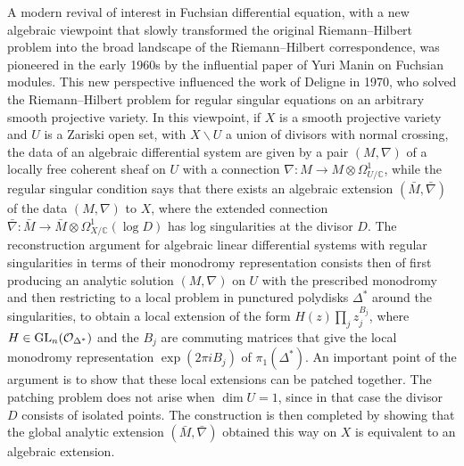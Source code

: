 \documentclass[10pt]{amsart}
\def\C{{\mathbb C}}
\renewcommand{\O}{{\mathcal O}}
\def\GL{{\rm GL}}
\numberwithin{equation}{section}
\begin{document}
A modern revival of interest in Fuchsian differential equation,
with a new algebraic viewpoint that slowly transformed the
original Riemann--Hilbert problem into the broad landscape of the
Riemann--Hilbert correspondence, was pioneered in the early 1960s
by the influential paper of Yuri Manin \cite{Man} on Fuchsian
modules. This new perspective influenced the work of Deligne
\cite{De1} in 1970, who solved the Riemann--Hilbert problem for
regular singular equations on an arbitrary smooth projective
variety. In this viewpoint, if $X$ is a smooth projective variety
and $U$ is a Zariski open set, with $X\smallsetminus U$ a union of
divisors with normal crossing, the data of an algebraic
differential system are given by a pair $(M,\nabla)$ of a locally
free coherent sheaf on $U$ with a connection $\nabla : M \to
M\otimes \Omega^1_{U/\C}$, while the regular singular condition
says that there exists an algebraic extension $(\bar M,
\bar\nabla)$ of the data $(M,\nabla)$ to $X$, where the extended
connection $\bar\nabla : \bar M \to \bar M \otimes
\Omega^1_{X/\C}(\log D)$ has log singularities at the divisor $D$.
The reconstruction argument for algebraic linear differential
systems with regular singularities in terms of their monodromy
representation consists then of first producing an analytic
solution $(M,\nabla)$ on $U$ with the prescribed monodromy and
then restricting to a local problem in punctured polydisks
$\Delta^*$ around the singularities, to obtain a local extension
of the form $H(z) \prod_j z_j^{B_j}$, where $H\in
\GL_n(\O_{\Delta^*})$ and the $B_j$ are commuting matrices that
give the local monodromy representation $\exp(2\pi i B_j)$ of
$\pi_1(\Delta^*)$. An important point of the argument is to show
that these local extensions can be patched together. The patching
problem does not arise when $\dim U=1$, since in that case the
divisor $D$ consists of isolated points. The construction is then
completed by showing that the global analytic extension $(\bar M,
\bar \nabla)$ obtained this way on $X$ is equivalent to an
algebraic extension.

\smallskip
\end{document}
